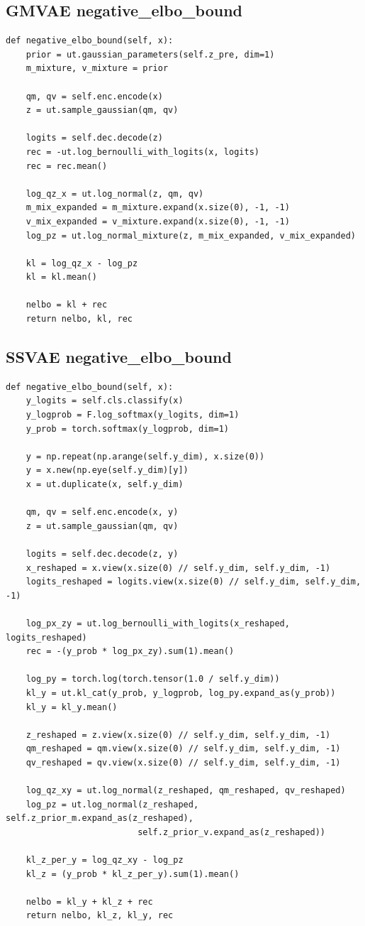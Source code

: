\documentclass{article}
\begin{document}
\subsection{GMVAE negative_elbo_bound}

\begin{verbatim}
def negative_elbo_bound(self, x):
    prior = ut.gaussian_parameters(self.z_pre, dim=1)
    m_mixture, v_mixture = prior

    qm, qv = self.enc.encode(x)
    z = ut.sample_gaussian(qm, qv)

    logits = self.dec.decode(z)
    rec = -ut.log_bernoulli_with_logits(x, logits)
    rec = rec.mean()

    log_qz_x = ut.log_normal(z, qm, qv)
    m_mix_expanded = m_mixture.expand(x.size(0), -1, -1)
    v_mix_expanded = v_mixture.expand(x.size(0), -1, -1)
    log_pz = ut.log_normal_mixture(z, m_mix_expanded, v_mix_expanded)

    kl = log_qz_x - log_pz
    kl = kl.mean()

    nelbo = kl + rec
    return nelbo, kl, rec
\end{verbatim}

\subsection{SSVAE negative_elbo_bound}

\begin{verbatim}
def negative_elbo_bound(self, x):
    y_logits = self.cls.classify(x)
    y_logprob = F.log_softmax(y_logits, dim=1)
    y_prob = torch.softmax(y_logprob, dim=1)

    y = np.repeat(np.arange(self.y_dim), x.size(0))
    y = x.new(np.eye(self.y_dim)[y])
    x = ut.duplicate(x, self.y_dim)

    qm, qv = self.enc.encode(x, y)
    z = ut.sample_gaussian(qm, qv)

    logits = self.dec.decode(z, y)
    x_reshaped = x.view(x.size(0) // self.y_dim, self.y_dim, -1)
    logits_reshaped = logits.view(x.size(0) // self.y_dim, self.y_dim, -1)

    log_px_zy = ut.log_bernoulli_with_logits(x_reshaped, logits_reshaped)
    rec = -(y_prob * log_px_zy).sum(1).mean()

    log_py = torch.log(torch.tensor(1.0 / self.y_dim))
    kl_y = ut.kl_cat(y_prob, y_logprob, log_py.expand_as(y_prob))
    kl_y = kl_y.mean()

    z_reshaped = z.view(x.size(0) // self.y_dim, self.y_dim, -1)
    qm_reshaped = qm.view(x.size(0) // self.y_dim, self.y_dim, -1)
    qv_reshaped = qv.view(x.size(0) // self.y_dim, self.y_dim, -1)

    log_qz_xy = ut.log_normal(z_reshaped, qm_reshaped, qv_reshaped)
    log_pz = ut.log_normal(z_reshaped, self.z_prior_m.expand_as(z_reshaped),
                          self.z_prior_v.expand_as(z_reshaped))

    kl_z_per_y = log_qz_xy - log_pz
    kl_z = (y_prob * kl_z_per_y).sum(1).mean()

    nelbo = kl_y + kl_z + rec
    return nelbo, kl_z, kl_y, rec
\end{verbatim}
\end{document}
